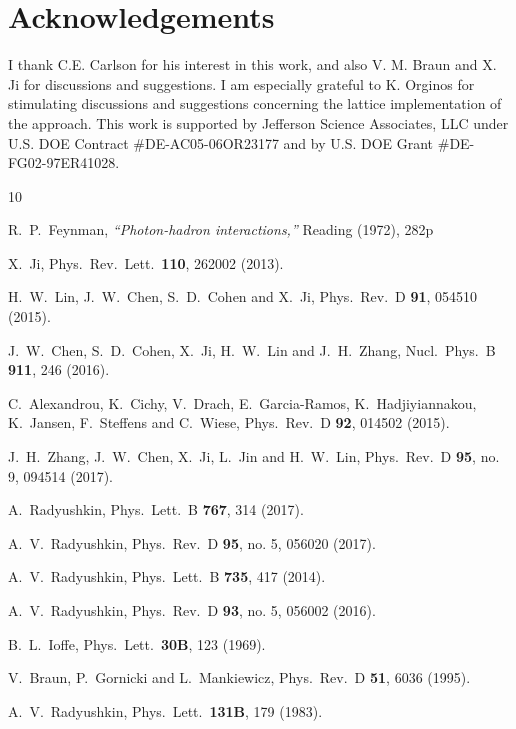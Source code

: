 \section*{Acknowledgements}

I thank C.E. Carlson for his
interest in this work, and also V. M. Braun and X. Ji for discussions
and suggestions.
I am especially
grateful to K. Orginos for stimulating discussions and suggestions concerning
the lattice implementation of the approach.
This work is supported by Jefferson Science Associates,
LLC under U.S. DOE Contract \#DE-AC05-06OR23177
and by U.S. DOE Grant \mbox{\#DE-FG02-97ER41028. }

\begin{thebibliography}{10}

R.~P.~Feynman,
{\it ``Photon-hadron interactions,''}
Reading (1972), 282p

X.~Ji,
Phys.\ Rev.\ Lett.\ {\bf 110}, 262002 (2013).

H.~W.~Lin, J.~W.~Chen, S.~D.~Cohen and X.~Ji,
Phys.\ Rev.\ D {\bf 91}, 054510 (2015).

J.~W.~Chen, S.~D.~Cohen, X.~Ji, H.~W.~Lin and J.~H.~Zhang,
Nucl.\ Phys.\ B {\bf 911}, 246 (2016).

C.~Alexandrou, K.~Cichy, V.~Drach, E.~Garcia-Ramos, K.~Hadjiyiannakou, K.~Jansen, F.~Steffens and C.~Wiese,
Phys.\ Rev.\ D {\bf 92}, 014502 (2015).

J.~H.~Zhang, J.~W.~Chen, X.~Ji, L.~Jin and H.~W.~Lin,
Phys.\ Rev.\ D {\bf 95}, no. 9, 094514 (2017).

A.~Radyushkin,
Phys.\ Lett.\ B {\bf 767}, 314 (2017).

A.~V.~Radyushkin,
Phys.\ Rev.\ D {\bf 95}, no. 5, 056020 (2017).

A.~V.~Radyushkin,
Phys.\ Lett.\ B {\bf 735}, 417 (2014).

A.~V.~Radyushkin,
Phys.\ Rev.\ D {\bf 93}, no. 5, 056002 (2016).

B.~L.~Ioffe,
Phys.\ Lett.\ {\bf 30B}, 123 (1969).

V.~Braun, P.~Gornicki and L.~Mankiewicz,
Phys.\ Rev.\ D {\bf 51}, 6036 (1995).

A.~V.~Radyushkin,
Phys.\ Lett.\ {\bf 131B}, 179 (1983).


\end{thebibliography}
